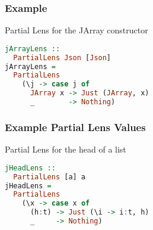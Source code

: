 \begin{frame}[fragile]
\frametitle{Example}

\begin{block}{Partial Lens for the JArray constructor}
\begin{lstlisting}[language=haskell]
jArrayLens ::
  PartialLens Json [Json]
jArrayLens =
  PartialLens
    (\j -> case j of 
      JArray x -> Just (JArray, x)
      _        -> Nothing)
\end{lstlisting}
\end{block}

\end{frame}

\begin{frame}[fragile]
\frametitle{Example Partial Lens Values}

\begin{block}{Partial Lens for the head of a list}
\begin{lstlisting}[language=haskell]
jHeadLens ::
  PartialLens [a] a
jHeadLens =
  PartialLens
    (\x -> case x of
      (h:t) -> Just (\i -> i:t, h)
      _     -> Nothing)
\end{lstlisting}
\end{block}

\end{frame}
